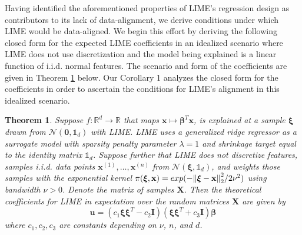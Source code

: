 \documentclass[12pt]{article}  %
\newtheorem{theorem}{Theorem}
\begin{document}
              Having identified the aforementioned properties of LIME's regression design as contributors to its lack of data-alignment, we derive conditions under which LIME would be data-aligned. We begin this effort by deriving the following closed form for the expected LIME coefficients in an idealized scenario where LIME does not use discretization and the model being explained is a linear function of i.i.d. normal features. The scenario and form of the coefficients are given in Theorem \ref{thm:lime_thm} below. Our Corollary 1 analyzes the closed form for the coefficients in order to ascertain the conditions for LIME's alignment in this idealized scenario. 
            \begin{theorem}
                \label{thm:lime_thm}
                Suppose $f:\mathbb{R}^d\rightarrow \mathbb{R}$ that maps $\mathbf{x} \mapsto \boldsymbol{\beta}^T \mathbf{x}$, is explained at a sample $\boldsymbol{\xi}$ drawn from $\mathcal{N}(\mathbf{0}, \mathds{1}_d)$ with LIME. LIME uses a generalized ridge regressor as a surrogate model with sparsity penalty parameter $\lambda=1$ and shrinkage target equal to the identity matrix $\mathds{1}_d$. Suppose further that LIME  does not discretize features, samples i.i.d. data points $\mathbf{x}^{(1)},\ldots,\mathbf{x}^{(n)}$ from $ \mathcal{N}(\boldsymbol{\xi}, \mathds{1}_d)$, and weights those samples with the exponential kernel $\pi(\boldsymbol{\xi},\mathbf{x}) = exp(-\norm{\boldsymbol{\xi}-\mathbf{x}}_2^2/2\nu^2)$ using bandwidth $\nu>0$. %
                Denote the matrix of samples $\mathbf{X}$. %
                 Then the theoretical coefficients for LIME in expectation over the random matrices $\mathbf{X}$ are given by 
                \begin{equation}
                    \mathbf{u} = (c_1\boldsymbol{\xi} \boldsymbol{\xi}^T - c_2 \mathbf{I})(\boldsymbol{\xi}\boldsymbol{\xi}^T + c_3 \mathbf{I})\boldsymbol{\beta}
                \end{equation}
                where $c_1,c_2,c_3$ are constants depending on $\nu$, $n$, and $d$. 
            \end{theorem}
\end{document}

